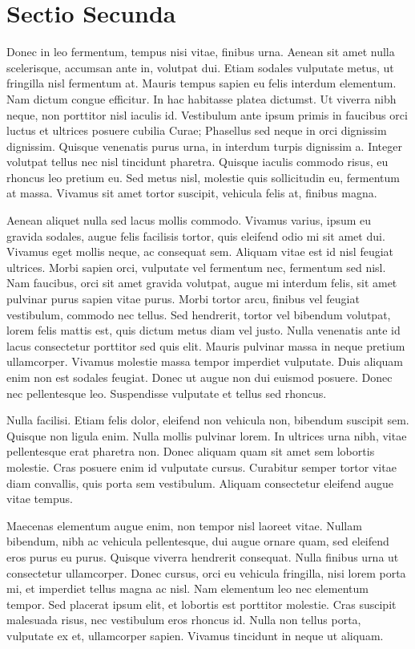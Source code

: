 \section{Sectio Secunda}
Donec in leo fermentum, tempus nisi vitae, finibus urna. Aenean sit amet nulla scelerisque, accumsan ante in, volutpat dui. Etiam sodales vulputate metus, ut fringilla nisl fermentum at. Mauris tempus sapien eu felis interdum elementum. Nam dictum congue efficitur. In hac habitasse platea dictumst. Ut viverra nibh neque, non porttitor nisl iaculis id. Vestibulum ante ipsum primis in faucibus orci luctus et ultrices posuere cubilia Curae; Phasellus sed neque in orci dignissim dignissim. Quisque venenatis purus urna, in interdum turpis dignissim a. Integer volutpat tellus nec nisl tincidunt pharetra. Quisque iaculis commodo risus, eu rhoncus leo pretium eu. Sed metus nisl, molestie quis sollicitudin eu, fermentum at massa. Vivamus sit amet tortor suscipit, vehicula felis at, finibus magna.

Aenean aliquet nulla sed lacus mollis commodo. Vivamus varius, ipsum eu gravida sodales, augue felis facilisis tortor, quis eleifend odio mi sit amet dui. Vivamus eget mollis neque, ac consequat sem. Aliquam vitae est id nisl feugiat ultrices. Morbi sapien orci, vulputate vel fermentum nec, fermentum sed nisl. Nam faucibus, orci sit amet gravida volutpat, augue mi interdum felis, sit amet pulvinar purus sapien vitae purus. Morbi tortor arcu, finibus vel feugiat vestibulum, commodo nec tellus. Sed hendrerit, tortor vel bibendum volutpat, lorem felis mattis est, quis dictum metus diam vel justo. Nulla venenatis ante id lacus consectetur porttitor sed quis elit. Mauris pulvinar massa in neque pretium ullamcorper. Vivamus molestie massa tempor imperdiet vulputate. Duis aliquam enim non est sodales feugiat. Donec ut augue non dui euismod posuere. Donec nec pellentesque leo. Suspendisse vulputate et tellus sed rhoncus.

Nulla facilisi. Etiam felis dolor, eleifend non vehicula non, bibendum suscipit sem. Quisque non ligula enim. Nulla mollis pulvinar lorem. In ultrices urna nibh, vitae pellentesque erat pharetra non. Donec aliquam quam sit amet sem lobortis molestie. Cras posuere enim id vulputate cursus. Curabitur semper tortor vitae diam convallis, quis porta sem vestibulum. Aliquam consectetur eleifend augue vitae tempus.

Maecenas elementum augue enim, non tempor nisl laoreet vitae. Nullam bibendum, nibh ac vehicula pellentesque, dui augue ornare quam, sed eleifend eros purus eu purus. Quisque viverra hendrerit consequat. Nulla finibus urna ut consectetur ullamcorper. Donec cursus, orci eu vehicula fringilla, nisi lorem porta mi, et imperdiet tellus magna ac nisl. Nam elementum leo nec elementum tempor. Sed placerat ipsum elit, et lobortis est porttitor molestie. Cras suscipit malesuada risus, nec vestibulum eros rhoncus id. Nulla non tellus porta, vulputate ex et, ullamcorper sapien. Vivamus tincidunt in neque ut aliquam.

